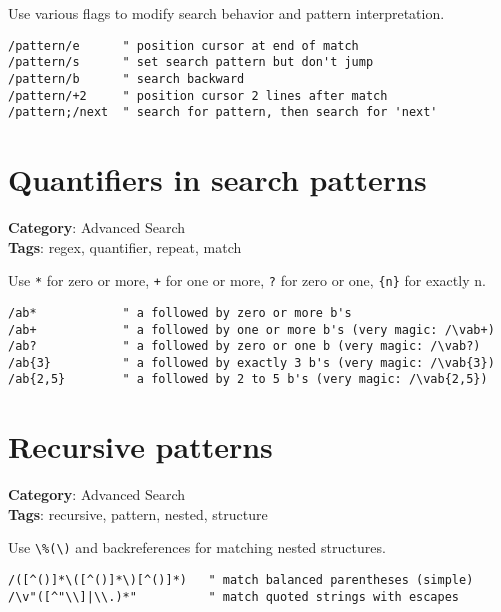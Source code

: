 Use various flags to modify search behavior and pattern interpretation.

\begin{Exa*}{}
\begin{Verbatim}[fontsize=\footnotesize, breaklines, breakanywhere]
/pattern/e      " position cursor at end of match
/pattern/s      " set search pattern but don't jump
/pattern/b      " search backward
/pattern/+2     " position cursor 2 lines after match
/pattern;/next  " search for pattern, then search for 'next'
\end{Verbatim}
\end{Exa*}

\section{Quantifiers in search patterns}

\textbf{Category}: Advanced Search\\ \textbf{Tags}: regex, quantifier, repeat, match
\vspace{0.5cm}

Use {\footnotesize \Verb§*§} for zero or more, {\footnotesize \Verb§+§} for one or more, {\footnotesize \Verb§?§} for zero or one, {\footnotesize \Verb§{n}§} for exactly n.

\begin{Exa*}{}
\begin{Verbatim}[fontsize=\footnotesize, breaklines, breakanywhere]
/ab*            " a followed by zero or more b's
/ab+            " a followed by one or more b's (very magic: /\vab+)
/ab?            " a followed by zero or one b (very magic: /\vab?)
/ab{3}          " a followed by exactly 3 b's (very magic: /\vab{3})
/ab{2,5}        " a followed by 2 to 5 b's (very magic: /\vab{2,5})
\end{Verbatim}
\end{Exa*}

\section{Recursive patterns}

\textbf{Category}: Advanced Search\\ \textbf{Tags}: recursive, pattern, nested, structure
\vspace{0.5cm}

Use {\footnotesize \Verb§\%(\)§} and backreferences for matching nested structures.

\begin{Exa*}{}
\begin{Verbatim}[fontsize=\footnotesize, breaklines, breakanywhere]
/([^()]*\([^()]*\)[^()]*)   " match balanced parentheses (simple)
/\v"([^"\\]|\\.)*"          " match quoted strings with escapes
\end{Verbatim}
\end{Exa*}

